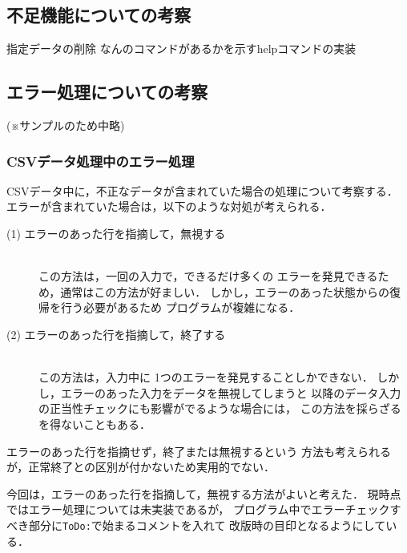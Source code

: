 \documentclass[a4j,11pt]{jarticle}
\begin{document}
\subsection{不足機能についての考察}

指定データの削除
なんのコマンドがあるかを示すhelpコマンドの実装

\subsection{エラー処理についての考察}

(※サンプルのため中略)

\subsubsection{CSVデータ処理中のエラー処理}

CSVデータ中に，不正なデータが含まれていた場合の処理について考察する．
エラーが含まれていた場合は，以下のような対処が考えられる．

\begin{description} %
  \item[(1) エラーのあった行を指摘して，無視する]~\\
    この方法は，一回の入力で，できるだけ多くの
    エラーを発見できるため，通常はこの方法が好ましい．
    しかし，エラーのあった状態からの復帰を行う必要があるため
    プログラムが複雑になる．
  \item[(2) エラーのあった行を指摘して，終了する]~\\
    この方法は，入力中に 1つのエラーを発見することしかできない．
    しかし，エラーのあった入力をデータを無視してしまうと
    以降のデータ入力の正当性チェックにも影響がでるような場合には，
    この方法を採らざるを得ないこともある．
\end{description}

エラーのあった行を指摘せず，終了または無視するという
方法も考えられるが，正常終了との区別が付かないため実用的でない．

今回は，エラーのあった行を指摘して，無視する方法がよいと考えた．
現時点ではエラー処理については未実装であるが，
プログラム中でエラーチェックすべき部分に\verb|ToDo:|で始まるコメントを入れて
改版時の目印となるようにしている．
\end{document}

